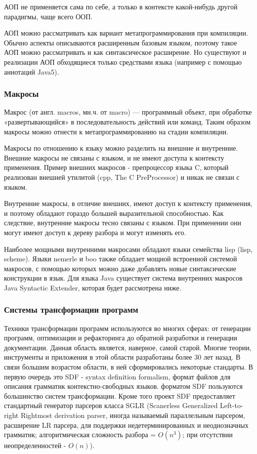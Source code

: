 \documentclass[a4paper,12pt]{article}
\begin{document}
АОП не применяется сама по себе, а только в контексте какой-нибудь другой
парадигмы, чаще всего ООП.

АОП можно рассматривать как вариант метапрограммирования при компиляции.
Обычно аспекты описываются расширенным базовым языком, поэтому такое АОП можно
рассматривать и как синтаксическое расширение. Но существуют и реализации АОП
обходящиеся только средствами языка (например с помощью аннотаций Java5).

\subsubsection{Макросы}
 Макрос (от англ. macros, мн.ч. от macro) — программный объект, при обработке
«развертывающийся» в последовательность действий или команд. Таким образом
макросы можно отнести к метапрограммированию на стадии компиляции.

Макросы по отношению к языку можно разделить на внешние и внутренние.
Внешние макросы не связаны с языком, и не имеют доступа к контексту применения.
Пример внешних макросов - препроцессор языка C, который реализован внешней
утилитой (cpp, The C PreProcessor) и никак не связан с языком.

Внутренние макросы, в отличие внешних, имеют доступ к контексту применения, и
поэтому обладают гораздо большей выразительной способностью. Как следствие,
внутренние макросы тесно связаны с языком. При применении они могут имеют
доступ к дереву разбора и могут изменять его.

Наиболее мощными внутренними макросами обладают языки семейства lisp
(lisp, scheme). Языки nemerle и boo также обладает мощной встроенной системой
макросов, с помощью которых можно даже добавлять новые синтаксические
конструкции в язык. Для языка Java существует система внутренних макросов Java
Syntactic Extender, которая будет рассмотрена ниже.

\subsubsection{Системы трансформации программ}
Техники трансформации программ используются во многих сферах: от генерации
программ, оптимизации и рефакторинга до обратной разработки и генерации
документации.
Данная область является, наверное, самой старой. Многие теории, инструменты и
приложения в этой области разработаны более 30 лет назад.
В связи большим возрастом области, в ней сформировались некоторые стандарты.
В первую очередь это SDF - syntax definition formalism, формат файлов для
описания грамматик контекстно-свободных языков. форматом SDF пользуются
большинство систем трансформации.
Кроме того проект SDF предоставляет стандартный генератор парсеров класса SGLR
(Scanerless Generalized Left-to-right Rightmost derivation parser, иногда
называемый параллельным парсером, расширение LR парсера, для поддержки
недетерминированных и неоднозначных грамматик; алгоритмическая сложность разбора
= $O(n^3)$; при отсутствии неопределенностей - $O(n)$).
\end{document}
